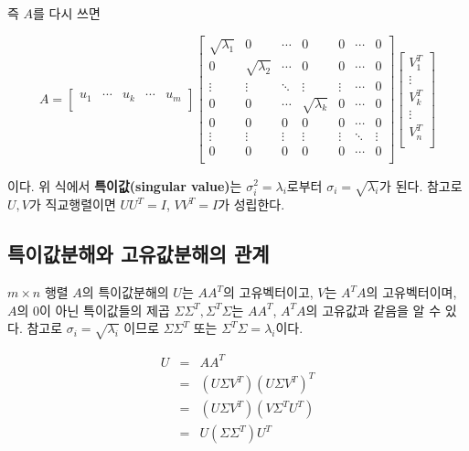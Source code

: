 \documentclass[b5paper,]{scrbook}
\theoremstyle{plain}
\theoremstyle{definition}
\numberwithin{equation}{section}
\begin{document}
즉 \(A\)를 다시 쓰면

\[
A=
\begin{bmatrix}
u_{1} & \cdots & u_{k} & \cdots & u_{m}\\
\end{bmatrix}
\begin{bmatrix}
\sqrt{\lambda_{1}} & 0 & \cdots & 0 & 0 & \cdots & 0\\
0 & \sqrt{\lambda_{2}} & \cdots & 0 & 0 & \cdots & 0\\
\vdots & \vdots & \ddots & \vdots & \vdots & \cdots & 0\\
0 & 0 & \cdots & \sqrt{\lambda_{k}} & 0 & \cdots & 0\\
0 & 0 & 0 & 0 & 0 & \cdots & 0\\
\vdots & \vdots & \vdots & \vdots & \vdots & \ddots & \vdots\\
0 & 0 & 0 & 0 & 0 & \cdots & 0\\
\end{bmatrix}
\begin{bmatrix}
V_{1}^{T}\\
\vdots \\
V_{k}^{T}\\
\vdots\\
V_{n}^{T}\\
\end{bmatrix}
\]

이다. 위 식에서 \textbf{특이값(singular value)}는
\(\sigma_{i}^{2}=\lambda_{i}\)로부터 \(\sigma_{i}=\sqrt{\lambda_{i}}\)가
된다. 참고로 \(U, V\)가 직교행렬이면 \(UU^{T}=I\), \(VV^{T}=I\)가
성립한다.

\subsection{특이값분해와 고유값분해의 관계}\label{--}

\(m\times n\) 행렬 \(A\)의 특이값분해의 \(U\)는 \(AA^{T}\)의
고유벡터이고, \(V\)는 \(A^{T}A\)의 고유벡터이며, \(A\)의 0이 아닌
특이값들의 제곱 \(\Sigma\Sigma^{T}, \Sigma^{T}\Sigma\)는 \(AA^{T}\),
\(A^{T}A\)의 고유값과 같음을 알 수 있다. 참고로
\(\sigma_{i}=\sqrt{\lambda_{i}}\) 이므로 \(\Sigma\Sigma^{T}\) 또는
\(\Sigma^{T}\Sigma=\lambda_{i}\)이다.

\begin{eqnarray*}
U&=&AA^{T}\\
&=&(U\Sigma V^{T})(U\Sigma V^{T})^{T}\\
&=&(U\Sigma V^{T})(V\Sigma^{T} U^{T})\\
&=&U(\Sigma\Sigma^{T})U^{T}\\
\end{eqnarray*}
\end{document}
